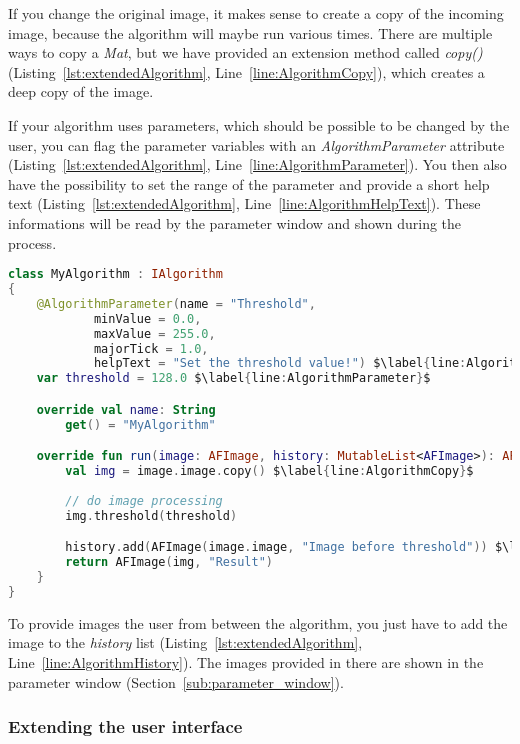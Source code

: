 If you change the original image, it makes sense to create a copy of the incoming image, because the algorithm will maybe run various times. There are multiple ways to copy a \textit{Mat}, but we have provided an extension method called \textit{copy()} (Listing~\ref{lst:extendedAlgorithm}, Line~\ref{line:AlgorithmCopy}), which creates a deep copy of the image.

If your algorithm uses parameters, which should be possible to be changed by the user, you can flag the parameter variables with an \textit{AlgorithmParameter} attribute (Listing~\ref{lst:extendedAlgorithm}, Line~\ref{line:AlgorithmParameter}). You then also have the possibility to set the range of the parameter and provide a short help text (Listing~\ref{lst:extendedAlgorithm}, Line~\ref{line:AlgorithmHelpText}). These informations will be read by the parameter window and shown during the process.

\begin{lstlisting}[caption={Extended version of an algorithm.}, label={lst:extendedAlgorithm}, language=Kotlin, escapechar=$]
class MyAlgorithm : IAlgorithm
{
    @AlgorithmParameter(name = "Threshold",
            minValue = 0.0,
            maxValue = 255.0,
            majorTick = 1.0,
            helpText = "Set the threshold value!") $\label{line:AlgorithmHelpText}$
    var threshold = 128.0 $\label{line:AlgorithmParameter}$

    override val name: String
        get() = "MyAlgorithm"

    override fun run(image: AFImage, history: MutableList<AFImage>): AFImage {
        val img = image.image.copy() $\label{line:AlgorithmCopy}$
        
        // do image processing
        img.threshold(threshold)

        history.add(AFImage(image.image, "Image before threshold")) $\label{line:AlgorithmHistory}$
        return AFImage(img, "Result")
    }
}
\end{lstlisting}

To provide images the user from between the algorithm, you just have to add the image to the \textit{history} list (Listing~\ref{lst:extendedAlgorithm}, Line~\ref{line:AlgorithmHistory}). The images provided in there are shown in the parameter window (Section~\ref{sub:parameter_window}).

\subsubsection{Extending the user interface}

